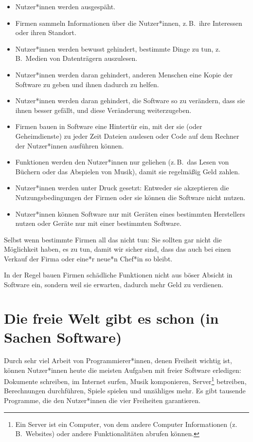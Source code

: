 \documentclass[a5paper,12pt]{scrartcl}
\begin{document}
\begin{itemize}
\item Nutzer*innen werden ausgespäht.
\item Firmen sammeln Informationen über die Nutzer*innen, z.\,B.\ ihre
  Interessen oder ihren Standort.
\item Nutzer*innen werden bewusst gehindert, bestimmte Dinge zu tun,
  z.\,B.\ Medien von Datenträgern auszulesen.
\item Nutzer*innen werden daran gehindert, anderen Menschen eine Kopie
  der Software zu geben und ihnen dadurch zu helfen.
\item Nutzer*innen werden daran gehindert, die Software so zu
  verändern, dass sie ihnen besser gefällt, und diese Veränderung
  weiterzugeben.
\item Firmen bauen in Software eine Hintertür ein, mit der sie (oder
  Geheimdienste) zu jeder Zeit Dateien auslesen oder Code auf dem
  Rechner der Nutzer*innen ausführen können.
\item Funktionen werden den Nutzer*innen nur geliehen (z.\,B.\ das
  Lesen von Büchern oder das Abspielen von Musik), damit sie
  regelmäßig Geld zahlen.
\item Nutzer*innen werden unter Druck gesetzt: Entweder sie
  akzeptieren die Nutzungsbedingungen der Firmen oder sie können die
  Software nicht nutzen.
\item Nutzer*innen können Software nur mit Geräten eines bestimmten
  Herstellers nutzen oder Geräte nur mit einer bestimmten Software.
\end{itemize}

Selbst wenn bestimmte Firmen all das nicht tun: Sie sollten gar nicht
die Möglichkeit haben, es zu tun, damit wir sicher sind, dass das auch
bei einen Verkauf der Firma oder eine*r neue*n Chef*in so bleibt.

In der Regel bauen Firmen schädliche Funktionen nicht aus böser
Absicht in Software ein, sondern weil sie erwarten, dadurch mehr Geld
zu verdienen.


\section{Die freie Welt gibt es schon (in Sachen Software)}

Durch sehr viel Arbeit von Programmierer*innen, denen Freiheit wichtig
ist, können Nutzer*innen heute die meisten Aufgaben mit freier
Software erledigen: Dokumente schreiben, im Internet surfen, Musik
komponieren, Server\footnote{Ein Server ist ein Computer, von dem
  andere Computer Informationen (z.\,B.\ Websites) oder andere
  Funktionalitäten abrufen können.}  betreiben, Berechnungen
durchführen, Spiele spielen und unzähliges mehr. Es gibt tausende
Programme, die den Nutzer*innen die vier Freiheiten garantieren.
\end{document}
